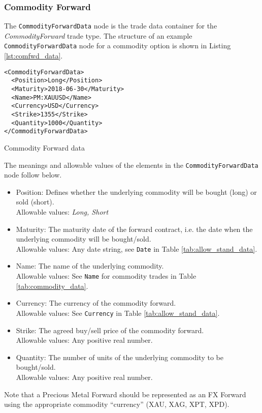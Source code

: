 \subsubsection{Commodity Forward}

The \lstinline!CommodityForwardData!  node is the trade data container for the  \emph{CommodityForward} trade type.   The structure of an example \lstinline!CommodityForwardData! node for a commodity option is shown in 
Listing \ref{lst:comfwd_data}.

\begin{listing}[H]
\begin{verbatim}
<CommodityForwardData>
  <Position>Long</Position>
  <Maturity>2018-06-30</Maturity>
  <Name>PM:XAUUSD</Name>
  <Currency>USD</Currency>
  <Strike>1355</Strike>
  <Quantity>1000</Quantity>
</CommodityForwardData>
\end{verbatim}
\caption{Commodity Forward data}
\label{lst:comfwd_data}
\end{listing}

The meanings and allowable values of the elements in the \lstinline!CommodityForwardData!  node follow below.

\begin{itemize}
	\item Position: Defines whether the underlying commodity will be bought (long) or sold (short). \\
	Allowable values: \emph{Long, Short}
	\item Maturity: The maturity date of the forward contract, i.e. the date when the underlying commodity will be bought/sold. \\
	Allowable values: Any date string, see \lstinline!Date! in Table \ref{tab:allow_stand_data}.
	\item Name: The name of the underlying commodity. \\
	Allowable values:  See \lstinline!Name! for commodity trades in Table \ref{tab:commodity_data}. \\
	\item Currency: The  currency of the commodity forward. \\
	Allowable values:  See \lstinline!Currency! in Table \ref{tab:allow_stand_data}.	
	\item Strike: The agreed buy/sell price of the commodity forward. \\
	Allowable values:  Any positive real number.	
	\item Quantity: The number of units of the underlying commodity to be bought/sold. \\
	Allowable values:  Any positive real number.
\end{itemize}

Note that a Precious Metal Forward should be represented as an FX
Forward using the appropriate commodity ``currency'' (XAU, XAG, XPT, XPD).

